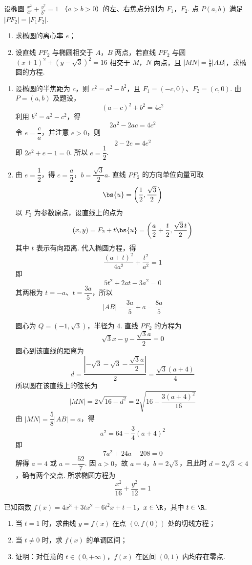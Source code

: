 \begin{problem}
设椭圆 \(\frac{x^2}{a^{2}} + \frac{y^2}{b^{2}} = 1 \) （\(a > b > 0\)）的左、右焦点分别为 \(F_1\)，\(F_2\). 点 \(P(a, b)\) 满足 \(|PF_2| = |F_1F_2|\).
\begin{enumerate}
\item 求椭圆的离心率 \( e \)；
\item 设直线 \(PF_{2}\) 与椭圆相交于 \(A\)，\(B\) 两点，若直线 \(PF_{2}\) 与圆 \((x + 1)^{2} + (y - \sqrt{3})^{2} = 16\) 相交于 \(M\)，\(N\) 两点，且 \(|MN| = \frac{5}{8} |AB|\)，求椭圆的方程.
\end{enumerate}
\end{problem}

\begin{solution}
\begin{enumerate}
\item 设椭圆的半焦距为 \(c\)，则 \(c^2=a^2-b^2\)，且 \(F_1=(-c,0)\)、\(F_2=(c,0)\). 由 \(P=(a,b)\) 及题设，
\[
(a-c)^2+b^2=4c^2
\]
利用 \(b^2=a^2-c^2\)，得
\[
2a^2-2ac=4c^2
\]
令 \(e=\dfrac ca\)，并注意 \(e>0\)，则
\[
2-2e=4e^2
\]
即 \(2e^2+e-1=0\). 所以 \(e=\dfrac12\).

\item 由 \(e=\dfrac12\)，得 \(c=\dfrac a2\)，\(b=\dfrac{\sqrt3}{2}a\). 直线 \(PF_2\) 的方向单位向量可取
\[
\bs{u}=\left(\frac12,\frac{\sqrt3}{2}\right)
\]
以 \(F_2\) 为参数原点，设直线上的点为
\[
(x,y)=F_2+t\bs{u}=\left(\frac a2+\frac t2,\frac{\sqrt3\,t}{2}\right)
\]
其中 \(t\) 表示有向距离. 代入椭圆方程，得
\[
\frac{(a+t)^2}{4a^2}+\frac{t^2}{a^2}=1
\]
即
\[
5t^2+2at-3a^2=0
\]
其两根为 \(t=-a\)、\(t=\dfrac{3a}{5}\)，所以
\[
|AB|=\frac{3a}{5}+a=\frac{8a}{5}
\]

圆心为 \(Q=(-1,\sqrt3)\)，半径为 \(4\). 直线 \(PF_2\) 的方程为
\[
\sqrt3x-y-\frac{\sqrt3a}{2}=0
\]
圆心到该直线的距离为
\[
d=\frac{\left|-\sqrt3-\sqrt3-\dfrac{\sqrt3a}{2}\right|}{2}
=\frac{\sqrt3(a+4)}{4}
\]
所以圆在该直线上的弦长为
\[
|MN|=2\sqrt{16-d^2}
=2\sqrt{16-\frac{3(a+4)^2}{16}}
\]
由 \(|MN|=\dfrac58|AB|=a\)，得
\[
a^2=64-\frac34(a+4)^2
\]
即
\[
7a^2+24a-208=0
\]
解得 \(a=4\) 或 \(a=-\dfrac{52}{7}\). 因 \(a>0\)，故 \(a=4\)，\(b=2\sqrt3\)，且此时 \(d=2\sqrt3<4\)，确有两个交点. 所求椭圆方程为
\[
\frac{x^2}{16}+\frac{y^2}{12}=1
\]
\end{enumerate}
\end{solution}



\begin{problem}
已知函数 \(f(x) = 4x^{3} + 3tx^{2} - 6t^{2}x + t - 1\)，\(x \in \R\)，其中 \( t \in \R\).
\begin{enumerate}
\item 当 \(t = 1\) 时，求曲线 \(y = f(x)\) 在点 \((0, f(0))\) 处的切线方程；
\item 当 \(t \neq 0\) 时，求 \(f(x)\) 的单调区间；
\item 证明：对任意的 \(t \in (0, +\infty)\)，\(f(x)\) 在区间 \((0, 1)\) 内均存在零点.
\end{enumerate}
\end{problem}

